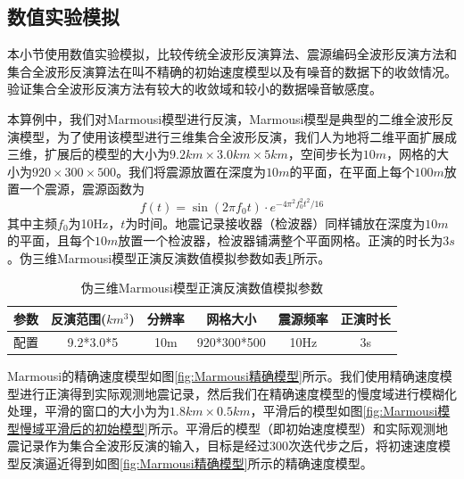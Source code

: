\documentclass[degree=doctor]{thuthesis}
\begin{document}
\subsection{数值实验模拟}
本小节使用数值实验模拟，比较传统全波形反演算法、震源编码全波形反演方法和集合全波形反演算法在叫不精确的初始速度模型以及有噪音的数据下的收敛情况。验证集合全波形反演方法有较大的收敛域和较小的数据噪音敏感度。

本算例中，我们对Marmousi模型进行反演，Marmousi模型是典型的二维全波形反演模型，为了使用该模型进行三维集合全波形反演，我们人为地将二维平面扩展成三维，扩展后的模型的大小为$9.2km\times 3.0km \times 5km$，空间步长为$10m$，网格的大小为$920\times 300 \times 500$。我们将震源放置在深度为$10m$的平面，在平面上每个$100m$放置一个震源，震源函数为
\begin{equation}
  f(t)=\sin(2\pi f_0t)\cdot e^{-4\pi^2f_0^2t^2/16}
\end{equation}
其中主频$f_0$为10Hz，$t$为时间。地震记录接收器（检波器）同样铺放在深度为$10m$的平面，且每个$10m$放置一个检波器，检波器铺满整个平面网格。正演的时长为$3s$。伪三维Marmousi模型正演反演数值模拟参数如表\ref{tb:伪三维Marmousi模型正演反演数值模拟参数}所示。

\begin{table}[ht]
\centering
\caption{伪三维Marmousi模型正演反演数值模拟参数}
\label{tb:伪三维Marmousi模型正演反演数值模拟参数}
\begin{tabular}{cccccc}
\hline
参数 & 反演范围($km^3$) & 分辨率 & 网格大小        & 震源频率 & 正演时长 \\\hline
配置 & 9.2*3.0*5     & 10m   & 920*300*500   & 10Hz    & 3s  \\\hline
\end{tabular}
\end{table}

Marmousi的精确速度模型如图\ref{fig:Marmousi精确模型}所示。我们使用精确速度模型进行正演得到实际观测地震记录，然后我们在精确速度模型的慢度域进行模糊化处理，平滑的窗口的大小为为$1.8km\times 0.5km$，平滑后的模型如图\ref{fig:Marmousi模型慢域平滑后的初始模型}所示。平滑后的模型（即初始速度模型）和实际观测地震记录作为集合全波形反演的输入，目标是经过300次迭代步之后，将初速速度模型反演逼近得到如图\ref{fig:Marmousi精确模型}所示的精确速度模型。
\end{document}
